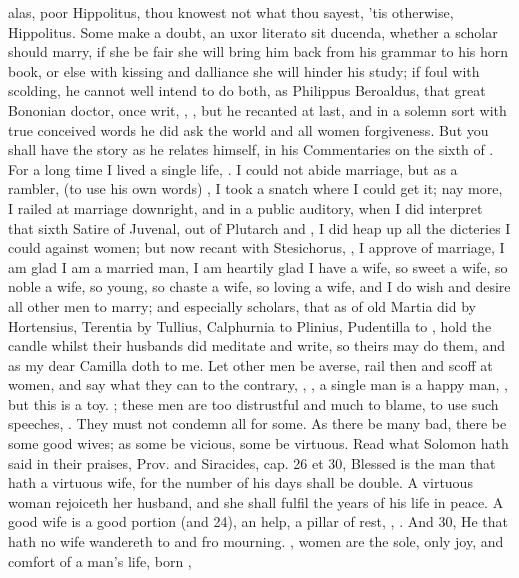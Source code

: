 alas, poor Hippolitus, thou knowest not what thou sayest, 'tis
otherwise, Hippolitus. Some make a doubt, an uxor literato sit
ducenda, whether a scholar should marry, if she be fair she will bring
him back from his grammar to his horn book, or else with kissing and
dalliance she will hinder his study; if foul with scolding, he cannot
well intend to do both, as Philippus Beroaldus, that great Bononian
doctor, once writ, , \etc{}, but he recanted
at last, and in a solemn sort with true conceived words he did ask the
world and all women forgiveness. But you shall have the story as he
relates himself, in his Commentaries on the sixth of \Apuleius{}. For a
long time I lived a single life, . I could not abide marriage,
but as a rambler,  (to use his own words)
, I took a snatch where I could get
it; nay more, I railed at marriage downright, and in a public auditory,
when I did interpret that sixth Satire of Juvenal, out of Plutarch and
\Seneca{}, I did heap up all the dicteries I could against women; but now
recant with Stesichorus, , I approve of marriage, I am glad I am a married
man, I am heartily glad I have a wife, so sweet a wife, so noble a
wife, so young, so chaste a wife, so loving a wife, and I do wish and
desire all other men to marry; and especially scholars, that as of old
Martia did by Hortensius, Terentia by Tullius, Calphurnia to Plinius,
Pudentilla to \Apuleius, hold the candle whilst their husbands did
meditate and write, so theirs may do them, and as my dear Camilla doth
to me. Let other men be averse, rail then and scoff at women, and say
what they can to the contrary, , \etc{},
a single man is a happy man, \etc{}, but this is a toy. ; these men are too distrustful and
much to blame, to use such speeches, . They must not condemn all for some. As there be many
bad, there be some good wives; as some be vicious, some be virtuous.
Read what Solomon hath said in their praises, Prov.  and
Siracides, cap. 26 et 30, Blessed is the man that hath a virtuous wife,
for the number of his days shall be double. A virtuous woman rejoiceth
her husband, and she shall fulfil the years of his life in peace. A
good wife is a good portion (and  24), an help, a pillar of rest,
, .
And 30, He that hath no wife wandereth to and fro mourning. , women are the sole, only joy, and comfort of a
man's life, born ,

